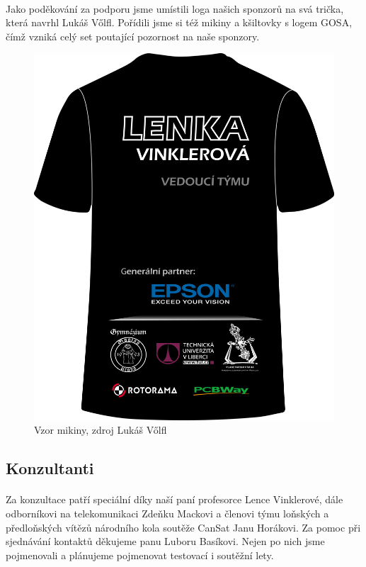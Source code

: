 \documentclass[a4paper]{report}
\begin{document}
\paragraph{} Jako poděkování za podporu jsme umístili loga našich sponzorů na svá trička, která navrhl Lukáš Vőlfl. Pořídili jsme si též mikiny a kšiltovky s logem GOSA, čímž vzniká celý set poutající pozornost na naše sponzory.
\begin{figure}[!h]
\centering
\caption{Vzor mikiny, zdroj Lukáš Vőlfl}
\includegraphics[width=500pt]{Triko_zada.png}
\end{figure}
\subsection{Konzultanti}
\paragraph{} Za konzultace patří speciální díky naší paní profesorce Lence Vinklerové, dále odborníkovi na telekomunikaci Zdeňku Mackovi a členovi týmu loňských a předloňských vítězů národního kola soutěže CanSat Janu Horákovi. Za pomoc při sjednávání kontaktů děkujeme panu Luboru Basíkovi. Nejen po nich jsme pojmenovali a plánujeme pojmenovat testovací i soutěžní lety.
\end{document}
